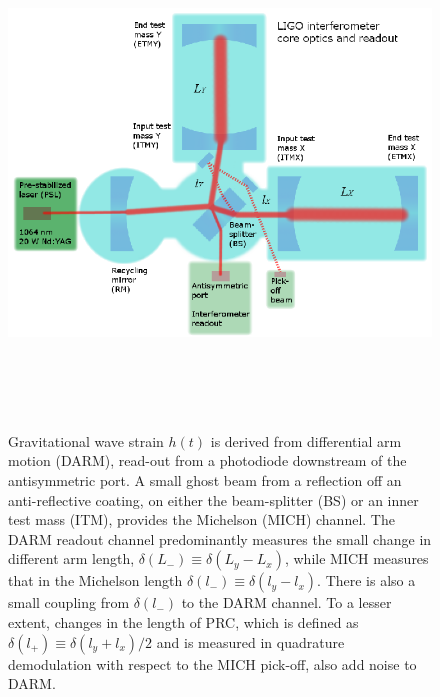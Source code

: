 \begin{figure}
\begin{center}
\includegraphics[height=135mm,width=150mm]{figure1.eps}
\caption{Gravitational wave strain $h(t)$ is derived from differential arm motion (DARM), read-out from a photodiode downstream of the antisymmetric port. A small ghost beam from a reflection off an anti-reflective coating, on either the beam-splitter (BS) or an inner test mass (ITM), provides the Michelson (MICH) channel. The DARM readout channel predominantly measures the small change in different arm length, $\delta(L_-) \equiv \delta(L_y - L_x)$, while MICH measures that in the Michelson length $\delta(l_-) \equiv \delta(l_y - l_x)$. There is also a small coupling from $\delta(l_-)$ to the DARM channel. To a lesser extent, changes in the length of PRC, which is defined as $\delta(l_+) \equiv \delta(l_y + l_x)/2$ and is measured in quadrature demodulation with respect to the MICH pick-off, also add noise to DARM.}
\label{arms}
\end{center}
\end{figure}



